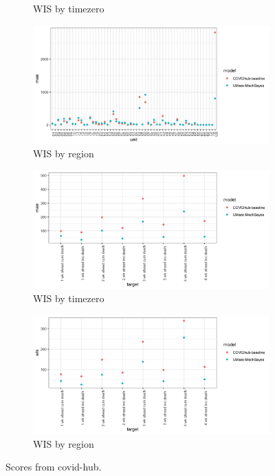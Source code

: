 \documentclass[11pt]{amsart}
\begin{document}
\begin{figure}
\begin{subfigure}{.5\textwidth}
    \caption{WIS by timezero}
\end{subfigure}%
\begin{subfigure}{.5\textwidth}
  \centering
    \includegraphics[scale=.1]{wis_results_by_region.png}
    \caption{WIS by region}
\end{subfigure}%
\begin{subfigure}{.5\textwidth}
  \centering
    \includegraphics[scale=.1]{mae_results_by_target.png}
    \caption{WIS by timezero}
\end{subfigure}%
\begin{subfigure}{.5\textwidth}
  \centering
    \includegraphics[scale=.1]{wis_results_by_target.png}
    \caption{WIS by region}
\end{subfigure}%

\caption{Scores from covid-hub.}
\label{fig:covidhub}
\end{figure}
\end{document}
